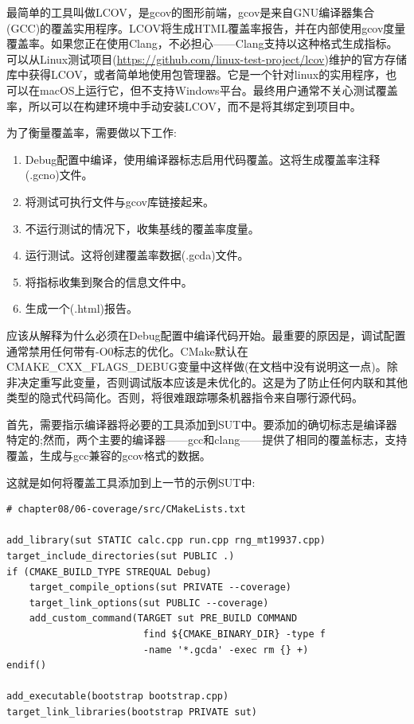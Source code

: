 最简单的工具叫做LCOV，是gcov的图形前端，gcov是来自GNU编译器集合(GCC)的覆盖实用程序。LCOV将生成HTML覆盖率报告，并在内部使用gcov度量覆盖率。如果您正在使用Clang，不必担心——Clang支持以这种格式生成指标。可以从Linux测试项目(\url{https://github.com/linux-test-project/lcov})维护的官方存储库中获得LCOV，或者简单地使用包管理器。它是一个针对linux的实用程序，也可以在macOS上运行它，但不支持Windows平台。最终用户通常不关心测试覆盖率，所以可以在构建环境中手动安装LCOV，而不是将其绑定到项目中。

为了衡量覆盖率，需要做以下工作:

\begin{enumerate}
\item 
Debug配置中编译，使用编译器标志启用代码覆盖。这将生成覆盖率注释(.gcno)文件。

\item 
将测试可执行文件与gcov库链接起来。

\item 
不运行测试的情况下，收集基线的覆盖率度量。

\item 
运行测试。这将创建覆盖率数据(.gcda)文件。

\item 
将指标收集到聚合的信息文件中。

\item 
生成一个(.html)报告。
\end{enumerate}

应该从解释为什么必须在Debug配置中编译代码开始。最重要的原因是，调试配置通常禁用任何带有-O0标志的优化。CMake默认在CMAKE\_CXX\_FLAGS\_DEBUG变量中这样做(在文档中没有说明这一点)。除非决定重写此变量，否则调试版本应该是未优化的。这是为了防止任何内联和其他类型的隐式代码简化。否则，将很难跟踪哪条机器指令来自哪行源代码。

首先，需要指示编译器将必要的工具添加到SUT中。要添加的确切标志是编译器特定的;然而，两个主要的编译器——gcc和clang——提供了相同的覆盖标志，支持覆盖，生成与gcc兼容的gcov格式的数据。

这就是如何将覆盖工具添加到上一节的示例SUT中:

\begin{lstlisting}[style=styleCMake]
# chapter08/06-coverage/src/CMakeLists.txt

add_library(sut STATIC calc.cpp run.cpp rng_mt19937.cpp)
target_include_directories(sut PUBLIC .)
if (CMAKE_BUILD_TYPE STREQUAL Debug)
	target_compile_options(sut PRIVATE --coverage)
	target_link_options(sut PUBLIC --coverage)
	add_custom_command(TARGET sut PRE_BUILD COMMAND
						find ${CMAKE_BINARY_DIR} -type f
						-name '*.gcda' -exec rm {} +)
endif()

add_executable(bootstrap bootstrap.cpp)
target_link_libraries(bootstrap PRIVATE sut)
\end{lstlisting}

